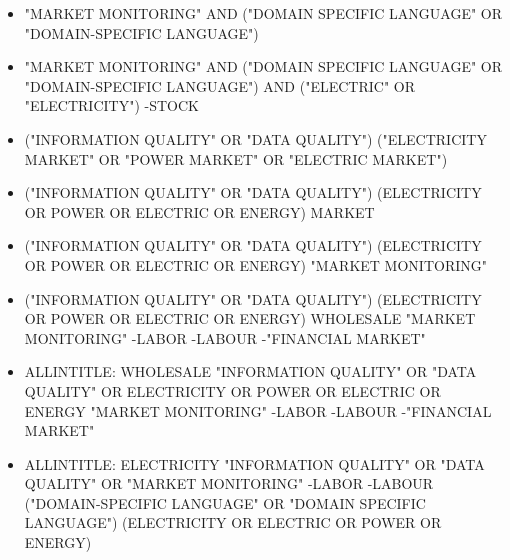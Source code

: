 \begin{itemize}
    \item \MakeUppercase{"MARKET MONITORING" AND ("DOMAIN SPECIFIC LANGUAGE" OR "DOMAIN-SPECIFIC LANGUAGE")}
    \item \MakeUppercase{"MARKET MONITORING" AND ("DOMAIN SPECIFIC LANGUAGE" OR "DOMAIN-SPECIFIC LANGUAGE") AND ("ELECTRIC" OR "ELECTRICITY") -stock}
    \item \MakeUppercase{("INFORMATION QUALITY" OR "DATA QUALITY") ("ELECTRICITY MARKET" OR "POWER MARKET" OR "ELECTRIC MARKET")}
    \item \MakeUppercase{("INFORMATION QUALITY" OR "DATA QUALITY") (ELECTRICITY OR POWER OR ELECTRIC OR ENERGY) MARKET}
    \item \MakeUppercase{("INFORMATION QUALITY" OR "DATA QUALITY") (ELECTRICITY OR POWER OR ELECTRIC OR ENERGY) "MARKET MONITORING"}
    \item \MakeUppercase{("INFORMATION QUALITY" OR "DATA QUALITY") (ELECTRICITY OR POWER OR ELECTRIC OR ENERGY) WHOLESALE "MARKET MONITORING" -labor -labour -"financial market"}
    \item \MakeUppercase{allintitle: WHOLESALE "INFORMATION QUALITY" OR "DATA QUALITY" OR ELECTRICITY OR POWER OR ELECTRIC OR ENERGY "MARKET MONITORING" -labor -labour -"financial market"}
    \item \MakeUppercase{allintitle: ELECTRICITY "INFORMATION QUALITY" OR "DATA QUALITY" OR "MARKET MONITORING" -labor -labour
    ("DOMAIN-SPECIFIC LANGUAGE" OR "DOMAIN SPECIFIC LANGUAGE") (ELECTRICITY OR ELECTRIC OR POWER OR ENERGY)}
    
\end{itemize}


\pagebreak{}